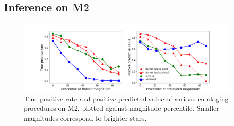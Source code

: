 \subsection{Inference on M2}

\begin{figure}[h]
    \centering
    \includegraphics[width=0.99\textwidth]{figures/summary_statistics_m2.png}
    \caption{True positive rate and positive predicted value of various cataloging
    procedures on M2, plotted against magnitude percentile.
    Smaller magnitudes correspond to brighter stars. }
    \label{fig:summary_stats}
\end{figure}



